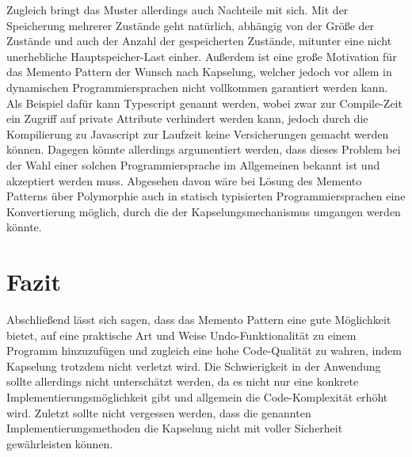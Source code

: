 \documentclass[9pt,conference]{IEEEtran}
\begin{document}
Zugleich bringt das Muster allerdings auch Nachteile mit sich.
Mit der Speicherung mehrerer Zustände geht natürlich, abhängig von der Größe der Zustände und auch der Anzahl der gespeicherten Zustände, mitunter eine nicht unerhebliche Hauptspeicher-Last einher.
Außerdem ist eine große Motivation für das Memento Pattern der Wunsch nach Kapselung, welcher jedoch vor allem in dynamischen Programmiersprachen nicht vollkommen garantiert werden kann.
Als Beispiel dafür kann Typescript genannt werden, wobei zwar zur Compile-Zeit ein Zugriff auf private Attribute verhindert werden kann, jedoch durch die Kompilierung zu Javascript zur Laufzeit keine Versicherungen gemacht werden können.
Dagegen könnte allerdings argumentiert werden, dass dieses Problem bei der Wahl einer solchen Programmiersprache im Allgemeinen bekannt ist und akzeptiert werden muss.
Abgesehen davon wäre bei Lösung des Memento Patterns über Polymorphie auch in statisch typisierten Programmiersprachen eine Konvertierung möglich, durch die der Kapselungsmechanismus umgangen werden könnte.

\section{Fazit}

Abschließend lässt sich sagen, dass das Memento Pattern eine gute Möglichkeit bietet, auf eine praktische Art und Weise \glqq{}Undo\grqq{}-Funktionalität zu einem Programm hinzuzufügen und zugleich eine hohe Code-Qualität zu wahren, indem Kapselung trotzdem nicht verletzt wird.
Die Schwierigkeit in der Anwendung sollte allerdings nicht unterschätzt werden, da es nicht nur eine konkrete Implementierungsmöglichkeit gibt und allgemein die Code-Komplexität erhöht wird.
Zuletzt sollte nicht vergessen werden, dass die genannten Implementierungsmethoden die Kapselung nicht mit voller Sicherheit gewährleisten können.


\end{document}
